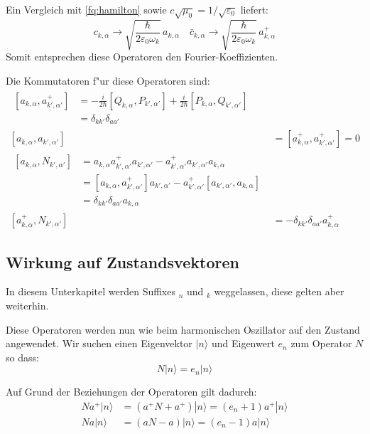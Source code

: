 Ein Vergleich mit \ref{fq:hamilton} sowie $c\sqrt{\mu_0}=1/\sqrt{\varepsilon_0}$ liefert:
\begin{equation} \label{fq:opp_fourier}
 c_{k,\alpha} \rightarrow \sqrt{\frac{\hbar}{2 \varepsilon_0 \omega_k}} \, a_{k,\alpha} \quad \bar{c}_{k,\alpha} \rightarrow \sqrt{\frac{\hbar}{2 \varepsilon_0 \omega_k}} \, a^+_{k,\alpha}
\end{equation}
Somit entsprechen diese Operatoren den Fourier-Koeffizienten.

Die Kommutatoren f"ur diese Operatoren sind:
\begin{align*}
\begin{split}
[a_{k,\alpha} , a^+_{k',\alpha'}] &= - \frac{i}{2 \hbar} [Q_{k,\alpha}, P_{k',\alpha'}] + \frac{i}{2 \hbar} [P_{k,\alpha}, Q_{k',\alpha'}] \\
	 &= \delta_{kk'}\delta_{aa'}
\end{split}\\
[a_{k,\alpha} , a_{k',\alpha'}] &= [a^+_{k,\alpha} , a^+_{k',\alpha'}] = 0 \\
\begin{split}
[a_{k,\alpha} , N_{k',\alpha'}] &= a_{k,\alpha} a^+_{k',\alpha'} a_{k',\alpha'} - a^+_{k',\alpha'} a_{k',\alpha'} a_{k,\alpha} \\
	&= [a_{k,\alpha} , a^+_{k',\alpha'}]a_{k',\alpha'} - a^+_{k',\alpha'}[a_{k',\alpha'} , a_{k,\alpha}]\\
	&= \delta_{kk'}\delta_{aa'} a_{k,\alpha}
\end{split} \\
[a^+_{k,\alpha} , N_{k',\alpha'}] &= -\delta_{kk'}\delta_{aa'} a^+_{k,\alpha}
\end{align*}

\subsection{Wirkung auf Zustandsvektoren}

In diesem Unterkapitel werden Suffixes $_n$ und $_k$ weggelassen, diese gelten aber weiterhin. 

Diese Operatoren werden nun wie beim harmonischen Oszillator auf den Zustand angewendet. Wir suchen einen Eigenvektor $|n\rangle$ und Eigenwert $e_n$ zum Operator $N$ so dass:
\begin{equation*}
N|n\rangle = e_n|n\rangle
\end{equation*}

Auf Grund der Beziehungen der Operatoren gilt dadurch:
\begin{align*}
Na^+|n\rangle &= (a^+N + a^+)|n\rangle = (e_n + 1)a^+|n\rangle \\
Na|n\rangle &= (aN - a)|n\rangle = (e_n - 1)a|n\rangle
\end{align*}

